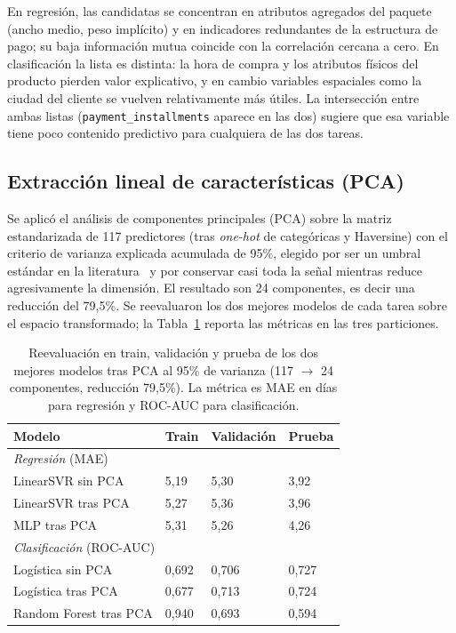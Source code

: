 \documentclass[journal]{IEEEtran}
\begin{document}
En regresión, las candidatas se concentran en atributos agregados del paquete (ancho medio, peso implícito) y en indicadores redundantes de la estructura de pago; su baja información mutua coincide con la correlación cercana a cero. En clasificación la lista es distinta: la hora de compra y los atributos físicos del producto pierden valor explicativo, y en cambio variables espaciales como la ciudad del cliente se vuelven relativamente más útiles. La intersección entre ambas listas (\texttt{payment\_installments} aparece en las dos) sugiere que esa variable tiene poco contenido predictivo para cualquiera de las dos tareas.

\subsection{Extracción lineal de características (PCA)}
\label{sec:pca}

Se aplicó el análisis de componentes principales (PCA) sobre la matriz estandarizada de 117 predictores (tras \textit{one-hot} de categóricas y Haversine) con el criterio de varianza explicada acumulada de 95\%, elegido por ser un umbral estándar en la literatura~\cite{wolter2024} y por conservar casi toda la señal mientras reduce agresivamente la dimensión. El resultado son 24 componentes, es decir una reducción del 79,5\%. Se reevaluaron los dos mejores modelos de cada tarea sobre el espacio transformado; la Tabla~\ref{tab:pca} reporta las métricas en las tres particiones.

\begin{table}[t]
\caption{Reevaluación en train, validación y prueba de los dos mejores modelos tras PCA al 95\% de varianza (117 $\to$ 24 componentes, reducción 79,5\%). La métrica es MAE en días para regresión y ROC-AUC para clasificación.}
\label{tab:pca}
\centering\scriptsize
\setlength{\tabcolsep}{3.5pt}
\begin{tabular}{p{2.6cm}p{0.9cm}p{1.1cm}p{0.9cm}}
\toprule
Modelo & Train & Validación & Prueba \\
\midrule
\multicolumn{4}{l}{\emph{Regresión} (MAE)}\\
LinearSVR sin PCA      & 5,19 & 5,30 & 3,92 \\
LinearSVR tras PCA     & 5,27 & 5,36 & 3,96 \\
MLP tras PCA           & 5,31 & 5,26 & 4,26 \\
\midrule
\multicolumn{4}{l}{\emph{Clasificación} (ROC-AUC)}\\
Logística sin PCA      & 0,692 & 0,706 & 0,727 \\
Logística tras PCA     & 0,677 & 0,713 & 0,724 \\
Random Forest tras PCA & 0,940 & 0,693 & 0,594 \\
\bottomrule
\end{tabular}
\end{table}
\end{document}
